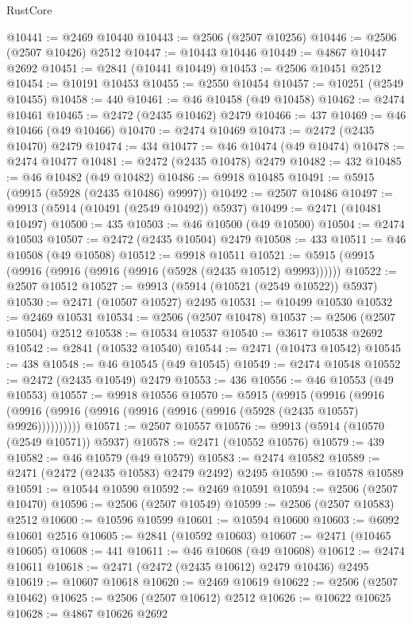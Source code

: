 \begin{lexlean}{RustCore}
\begin{coremodule}
@10441 := @2469 @10440
@10443 := @2506 (@2507 @10256)
@10446 := @2506 (@2507 @10426) @2512
@10447 := @10443 @10446
@10449 := @4867 @10447 @2692
@10451 := @2841 (@10441 @10449)
@10453 := @2506 @10451 @2512
@10454 := @10191 @10453
@10455 := @2550 @10454
@10457 := @10251 (@2549 @10455)
@10458 := 440
@10461 := @46 @10458 (@49 @10458)
@10462 := @2474 @10461
@10465 := @2472 (@2435 @10462) @2479
@10466 := 437
@10469 := @46 @10466 (@49 @10466)
@10470 := @2474 @10469
@10473 := @2472 (@2435 @10470) @2479
@10474 := 434
@10477 := @46 @10474 (@49 @10474)
@10478 := @2474 @10477
@10481 := @2472 (@2435 @10478) @2479
@10482 := 432
@10485 := @46 @10482 (@49 @10482)
@10486 := @9918 @10485
@10491 := @5915 (@9915 (@5928 (@2435 @10486) @9997))
@10492 := @2507 @10486
@10497 := @9913 (@5914 (@10491 (@2549 @10492)) @5937)
@10499 := @2471 (@10481 @10497)
@10500 := 435
@10503 := @46 @10500 (@49 @10500)
@10504 := @2474 @10503
@10507 := @2472 (@2435 @10504) @2479
@10508 := 433
@10511 := @46 @10508 (@49 @10508)
@10512 := @9918 @10511
@10521 := @5915 (@9915 (@9916 (@9916 (@9916 (@9916 (@5928 (@2435 @10512) @9993))))))
@10522 := @2507 @10512
@10527 := @9913 (@5914 (@10521 (@2549 @10522)) @5937)
@10530 := @2471 (@10507 @10527) @2495
@10531 := @10499 @10530
@10532 := @2469 @10531
@10534 := @2506 (@2507 @10478)
@10537 := @2506 (@2507 @10504) @2512
@10538 := @10534 @10537
@10540 := @3617 @10538 @2692
@10542 := @2841 (@10532 @10540)
@10544 := @2471 (@10473 @10542)
@10545 := 438
@10548 := @46 @10545 (@49 @10545)
@10549 := @2474 @10548
@10552 := @2472 (@2435 @10549) @2479
@10553 := 436
@10556 := @46 @10553 (@49 @10553)
@10557 := @9918 @10556
@10570 := @5915
    (@9915
      (@9916 (@9916 (@9916 (@9916 (@9916 (@9916 (@9916 (@9916 (@5928 (@2435 @10557) @9926))))))))))
@10571 := @2507 @10557
@10576 := @9913 (@5914 (@10570 (@2549 @10571)) @5937)
@10578 := @2471 (@10552 @10576)
@10579 := 439
@10582 := @46 @10579 (@49 @10579)
@10583 := @2474 @10582
@10589 := @2471 (@2472 (@2435 @10583) @2479 @2492) @2495
@10590 := @10578 @10589
@10591 := @10544 @10590
@10592 := @2469 @10591
@10594 := @2506 (@2507 @10470)
@10596 := @2506 (@2507 @10549)
@10599 := @2506 (@2507 @10583) @2512
@10600 := @10596 @10599
@10601 := @10594 @10600
@10603 := @6092 @10601 @2516
@10605 := @2841 (@10592 @10603)
@10607 := @2471 (@10465 @10605)
@10608 := 441
@10611 := @46 @10608 (@49 @10608)
@10612 := @2474 @10611
@10618 := @2471 (@2472 (@2435 @10612) @2479 @10436) @2495
@10619 := @10607 @10618
@10620 := @2469 @10619
@10622 := @2506 (@2507 @10462)
@10625 := @2506 (@2507 @10612) @2512
@10626 := @10622 @10625
@10628 := @4867 @10626 @2692

\end{coremodule}
\end{lexlean}
